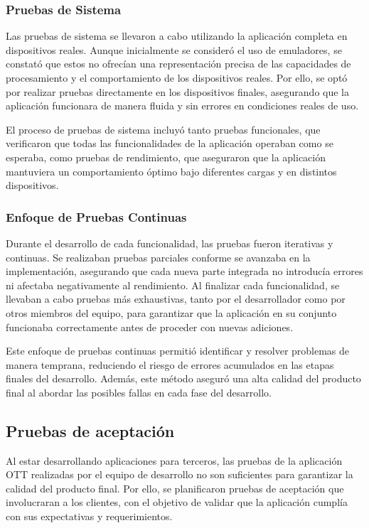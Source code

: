 \subsubsection{Pruebas de Sistema}
Las pruebas de sistema se llevaron a cabo utilizando la aplicación completa en dispositivos reales. Aunque inicialmente se consideró 
el uso de emuladores, se constató que estos no ofrecían una representación precisa de las capacidades de procesamiento y el 
comportamiento de los dispositivos reales. Por ello, se optó por realizar pruebas directamente en los dispositivos finales, 
asegurando que la aplicación funcionara de manera fluida y sin errores en condiciones reales de uso.

El proceso de pruebas de sistema incluyó tanto pruebas funcionales, que verificaron que todas las funcionalidades de la
aplicación operaban como se esperaba, como pruebas de rendimiento, que aseguraron que la aplicación mantuviera un comportamiento 
óptimo bajo diferentes cargas y en distintos dispositivos.

\subsubsection{Enfoque de Pruebas Continuas}
Durante el desarrollo de cada funcionalidad, las pruebas fueron iterativas y continuas. Se realizaban pruebas parciales conforme 
se avanzaba en la implementación, asegurando que cada nueva parte integrada no introducía errores ni afectaba negativamente al 
rendimiento. Al finalizar cada funcionalidad, se llevaban a cabo pruebas más exhaustivas, tanto por el desarrollador como por 
otros miembros del equipo, para garantizar que la aplicación en su conjunto funcionaba correctamente antes de proceder con nuevas adiciones.

Este enfoque de pruebas continuas permitió identificar y resolver problemas de manera temprana, reduciendo el riesgo de errores 
acumulados en las etapas finales del desarrollo. Además, este método aseguró una alta calidad del producto final al abordar las 
posibles fallas en cada fase del desarrollo.

\subsection{Pruebas de aceptación}
\label{subsec:pruebas_aceptacion}

Al estar desarrollando aplicaciones para terceros, las pruebas de la aplicación OTT realizadas por el equipo de desarrollo no son suficientes
para garantizar la calidad del producto final. Por ello, se planificaron pruebas de aceptación que involucraran a los
clientes, con el objetivo de validar que la aplicación cumplía con sus expectativas y requerimientos.

